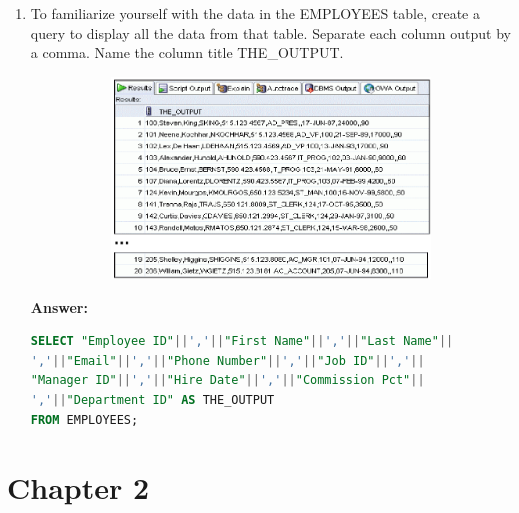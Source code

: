\documentclass[a4paper,12pt]{article}
\begin{document}
\begin{enumerate}[start=8]
    \item To familiarize yourself with the data in the EMPLOYEES table, create a query to display all the data from that table. Separate each column output by a comma. Name the column title THE\_OUTPUT.
    \begin{figure}[h]
        \centering
        \begin{subfigure}[b]{0.4\linewidth}
            \centering
            \includegraphics[width=\linewidth]{graphics/10.png}
        \end{subfigure}
    \end{figure}

    \textbf{Answer: }
    \begin{lstlisting}[language=SQL, label={lst:employees_data}]
SELECT "Employee ID"||','||"First Name"||','||"Last Name"||
','||"Email"||','||"Phone Number"||','||"Job ID"||','||
"Manager ID"||','||"Hire Date"||','||"Commission Pct"||
','||"Department ID" AS THE_OUTPUT
FROM EMPLOYEES;
    \end{lstlisting}
    
\end{enumerate}
\newpage
\section*{Chapter 2}
\end{document}
